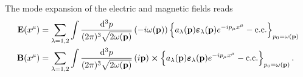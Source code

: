 \begin{theorem}\label{thm:mw_coulomb_mode_expansion_em_field}
	The mode expansion of the electric and magnetic fields reads
	\begin{align}
		\vb{E}(x^\mu)
		&=
		\sum_{\lambda=1,2}
		\int\frac{\dd[3]{p}}{(2\pi)^3\sqrt{2\omega(\vb{p})}}
		\left(
			-i
			\omega(\vb{p})
		\right)
		\left\{
			a_\lambda(\vb{p})
			\boldsymbol{\varepsilon}_\lambda(\vb{p})
			e^{-ip_\mu x^\mu}
			-
			\text{c.c.}
		\right\}_{p_0=\omega(\vb{p})}
		\\
		\vb{B}(x^\mu)
		&=
		\sum_{\lambda=1,2}
		\int\frac{\dd[3]{p}}{(2\pi)^3\sqrt{2\omega(\vb{p})}}
		\left(
			i\vb{p}
		\right)
		\cross
		\left\{
			a_\lambda(\vb{p})
			\boldsymbol{\varepsilon}_\lambda(\vb{p})
			e^{-ip_\mu x^\mu}
			-
			\text{c.c.}
		\right\}_{p_0=\omega(\vb{p})}
		\label{eq:mw_coulomb_mode_expansion_em_field}
		.
	\end{align}
\end{theorem}

